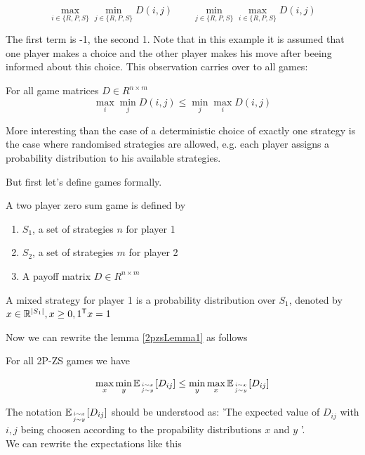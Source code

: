 \[\max_{i\in \{R,P,S\}} \min_{j\in \{R,P,S\}} D(i,j) \qquad \min_{j\in \{R,P,S\}}\max_{i\in \{R,P,S\}} D(i,j)\]

The first term is -1, the second 1. Note that in this example it is assumed that one player makes a choice and the other player makes his move after beeing informed about this choice. This observation carries over to all games:

\begin{lem}\label{2pzsLemma1} For all game matrices $D\in R^{n\times m}$
\[\max_{i} \min_{j} D(i,j) \leq \min_{j}\max_{i} D(i,j)\]
\end{lem}

More interesting than the case of a deterministic choice of exactly one strategy is the case where randomised strategies are allowed, e.g. each player assigns a probability distribution to his available strategies.

But first let's define games formally.

\begin{Def}[2P-ZS Games] A two player zero sum game is defined by 
\begin{enumerate}
\item $S_1$, a set of strategies $n$ for player 1
\item $S_2$, a set of strategies $m$ for player 2
\item A payoff matrix $D\in R^{n\times m}$ %
\end{enumerate}
\end{Def}

\begin{Def} A mixed strategy for player 1 is a probability distribution over $S_1$, denoted by $x\in \mathbb{R}^{|S_1|}, x\geq 0, {1}^\text{\upshape \sffamily T} x=1$
\end{Def}

Now we can rewrite the lemma \ref{2pzsLemma1} as follows

\begin{lem} For all 2P-ZS games we have

\[\max_x\min_y\mathbb{E}_{{i\sim x}\atop {j\sim y}} [D_{ij}] \leq \min_y\max_x\mathbb{E}_{{i\sim x}\atop {j\sim y}} [D_{ij}]\]

\end{lem}

The notation $\mathbb{E}_{{i\sim x}\atop {j\sim y}} [D_{ij}]$ should be understood as: 'The expected value of $D_{ij}$ with $i,j$ being choosen according to the propability distributions $x$ and $y$ '.\\ 
We can rewrite the expectations like this

